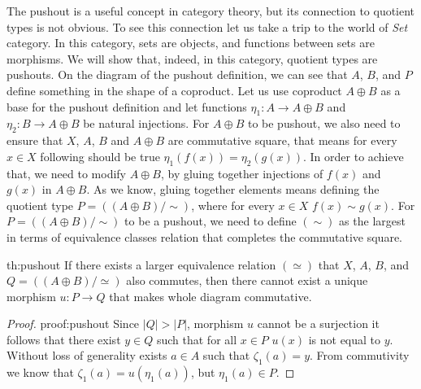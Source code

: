 The pushout is a useful concept in category theory, but its connection to quotient types is not obvious. To see this connection let us take a trip to the world of \emph{Set} category. In this category, sets are objects, and functions between sets are morphisms. We will show that, indeed, in this category, quotient types are pushouts. On the diagram of the pushout definition, we can see that $A$, $B$, and $P$ define something in the shape of a coproduct. Let us use coproduct $A \oplus B$ as a base for the pushout definition and let functions $\eta_1: A \rightarrow A \oplus B$ and $\eta_2: B \rightarrow A \oplus B$ be natural injections. For $A \oplus B$ to be pushout, we also need to ensure that $X$, $A$, $B$ and $A \oplus B$ are commutative square, that means for every $x \in X$ following should be true $\eta_1(f(x)) = \eta_2(g(x))$. In order to achieve that, we need to modify $A \oplus B$, by gluing together injections of $f(x)$ and $g(x)$ in $A \oplus B$. As we know, gluing together elements means defining the quotient type $P = ((A \oplus B) / \sim)$, where for every $x \in X$ $f(x) \sim g(x)$. For $P = ((A \oplus B) / \sim)$ to be a pushout, we need to define $(\sim)$ as the largest in terms of equivalence classes relation that completes the commutative square. 
\begin{theo}{}{th:pushout}
If there exists a larger equivalence relation $(\simeq)$ that $X$, $A$, $B$, and $Q = ((A \oplus B
)/\simeq)$ also commutes, then there cannot exist a unique morphism $u: P \rightarrow Q$ that makes whole diagram commutative. 
\end{theo}

\begin{proof}{}{proof:pushout}
Since $|Q| > |P|$, morphism $u$ cannot be a surjection it follows that there exist $y \in Q$ such that for all  $x \in P$ $u(x)$ is not equal to $y$. 
Without loss of generality exists $a \in A$ such that $\zeta_1(a) = y$. From commutivity we know that $\zeta_1(a) = u(\eta_1(a))$, but $\eta_1(a) \in P$. \contradiction
\end{proof}

